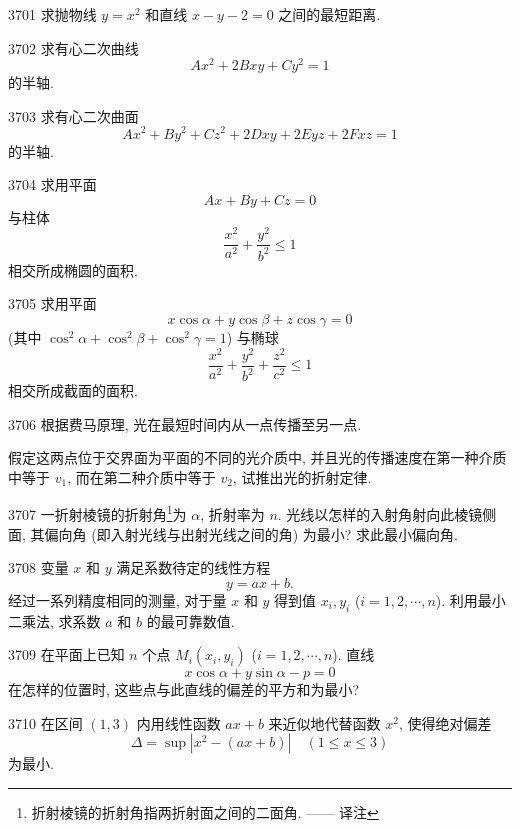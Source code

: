 \begin{prob}[S]{3701}
求抛物线 $y = x^2$ 和直线 $x - y - 2 = 0$ 之间的最短距离.
\end{prob}

\begin{prob}[M]{3702}
求有心二次曲线
\[
Ax^2 + 2Bxy + Cy^2 = 1
\]
的半轴.
\end{prob}

\begin{prob}[M]{3703}
求有心二次曲面
\[
Ax^2 + By^2 + Cz^2 + 2Dxy + 2Eyz + 2Fxz = 1
\]
的半轴.
\end{prob}

\begin{prob}[M]{3704}
求用平面
\[
Ax + By + Cz = 0
\]
与柱体
\[
\frac{x^2}{a^2} + \frac{y^2}{b^2} \leqslant 1
\]
相交所成椭圆的面积.
\end{prob}

\begin{prob}[M]{3705}
求用平面
\[
x\cos\alpha + y\cos\beta + z\cos\gamma = 0
\]
(其中 $\cos^2\alpha + \cos^2\beta + \cos^2\gamma = 1$) 与椭球
\[
\frac{x^2}{a^2} + \frac{y^2}{b^2} + \frac{z^2}{c^2} \leqslant 1
\]
相交所成截面的面积.
\end{prob}

\begin{prob}[M]{3706}
根据费马原理, 光在最短时间内从一点传播至另一点.

假定这两点位于交界面为平面的不同的光介质中, 并且光的传播速度在第一种介质中等于 $v_1$, 而在第二种介质中等于 $v_2$, 试推出光的折射定律.
\end{prob}

\begin{prob}[M]{3707}
一折射棱镜的折射角\footnote{折射棱镜的折射角指两折射面之间的二面角. —— 译注}为 $\alpha$, 折射率为 $n$. 光线以怎样的入射角射向此棱镜侧面, 其偏向角 (即入射光线与出射光线之间的角) 为最小? 求此最小偏向角.
\end{prob}

\begin{prob}[M]{3708}
变量 $x$ 和 $y$ 满足系数待定的线性方程
\[
y = ax + b.
\]
经过一系列精度相同的测量, 对于量 $x$ 和 $y$ 得到值 $x_i, y_i$ ($i = 1, 2, \cdots, n$). 利用最小二乘法, 求系数 $a$ 和 $b$ 的最可靠数值.
\end{prob}

\begin{prob}[M]{3709}
在平面上已知 $n$ 个点 $M_i(x_i, y_i)$ ($i = 1, 2, \cdots, n$). 直线
\[
x\cos\alpha + y\sin\alpha - p = 0
\]
在怎样的位置时, 这些点与此直线的偏差的平方和为最小?
\end{prob}

\begin{prob}[M]{3710}
在区间 $(1, 3)$ 内用线性函数 $ax + b$ 来近似地代替函数 $x^2$, 使得绝对偏差
\[
\Delta = \sup |x^2 - (ax + b)| \quad (1 \leqslant x \leqslant 3)
\]
为最小.
\end{prob}
